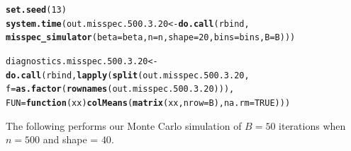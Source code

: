 \documentclass[11pt]{article}\usepackage[]{graphicx}\usepackage[]{color}
\makeatletter
\newcommand{\hlnum}[1]{\textcolor[rgb]{0.686,0.059,0.569}{#1}}%
\newcommand{\hlstd}[1]{\textcolor[rgb]{0.345,0.345,0.345}{#1}}%
\newcommand{\hlkwa}[1]{\textcolor[rgb]{0.161,0.373,0.58}{\textbf{#1}}}%
\newcommand{\hlkwb}[1]{\textcolor[rgb]{0.69,0.353,0.396}{#1}}%
\newcommand{\hlkwc}[1]{\textcolor[rgb]{0.333,0.667,0.333}{#1}}%
\newcommand{\hlkwd}[1]{\textcolor[rgb]{0.737,0.353,0.396}{\textbf{#1}}}%
\newenvironment{kframe}{%
 \def\at@end@of@kframe{}%
 \ifinner\ifhmode%
  \def\at@end@of@kframe{\end{minipage}}%
  \begin{minipage}{\columnwidth}%
 \fi\fi%
 \def\FrameCommand##1{\hskip\@totalleftmargin \hskip-\fboxsep
 \colorbox{shadecolor}{##1}\hskip-\fboxsep
     \hskip-\linewidth \hskip-\@totalleftmargin \hskip\columnwidth}%
 \MakeFramed {\advance\hsize-\width
   \@totalleftmargin\z@ \linewidth\hsize
   \@setminipage}}%
 {\par\unskip\endMakeFramed%
 \at@end@of@kframe}
\newenvironment{knitrout}{}{} %
\makeatother
\begin{document}
\begin{knitrout}
\color{fgcolor}\begin{kframe}
\begin{alltt}
\hlkwd{set.seed}\hlstd{(}\hlnum{13}\hlstd{)}
\hlkwd{system.time}\hlstd{(out.misspec.500.3.20} \hlkwb{<-} \hlkwd{do.call}\hlstd{(rbind,}
  \hlkwd{misspec_simulator}\hlstd{(}\hlkwc{beta} \hlstd{= beta,} \hlkwc{n} \hlstd{= n,} \hlkwc{shape} \hlstd{=} \hlnum{20}\hlstd{,} \hlkwc{bins} \hlstd{= bins,} \hlkwc{B} \hlstd{= B)))}
\end{alltt}


{\ttfamily\noindent\bfseries\color{errorcolor}{\#\# Error in chol.default(crossprod(x) + lambda[j] * diag(v)): the leading minor of order 5 is not positive definite}}

{\ttfamily\noindent\itshape\color{messagecolor}{\#\# Timing stopped at: 0.219 0 0.218}}\begin{alltt}
\hlstd{diagnostics.misspec.500.3.20} \hlkwb{<-} \hlkwd{do.call}\hlstd{(rbind,} \hlkwd{lapply}\hlstd{(}\hlkwd{split}\hlstd{(out.misspec.500.3.20,}
  \hlkwc{f} \hlstd{=} \hlkwd{as.factor}\hlstd{(}\hlkwd{rownames}\hlstd{(out.misspec.500.3.20))),}
  \hlkwc{FUN} \hlstd{=} \hlkwa{function}\hlstd{(}\hlkwc{xx}\hlstd{)} \hlkwd{colMeans}\hlstd{(}\hlkwd{matrix}\hlstd{(xx,} \hlkwc{nrow} \hlstd{= B),} \hlkwc{na.rm} \hlstd{=} \hlnum{TRUE}\hlstd{)))}
\end{alltt}


{\ttfamily\noindent\bfseries\color{errorcolor}{\#\# Error in split(out.misspec.500.3.20, f = as.factor(rownames(out.misspec.500.3.20))): object 'out.misspec.500.3.20' not found}}\end{kframe}
\end{knitrout}


The following performs our Monte Carlo simulation of $B = 50$ iterations 
when $n = 500$ and shape = $40$.
\end{document}

